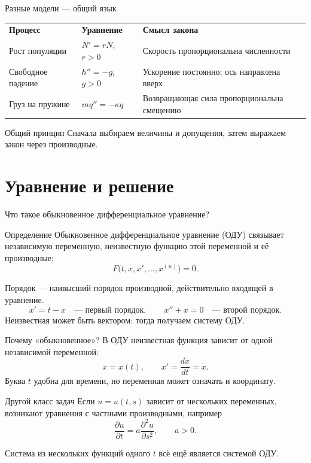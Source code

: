 \documentclass[aspectratio=169,11pt]{beamer}
\begin{document}
\begin{frame}{Разные модели --- общий язык}
  \renewcommand{\arraystretch}{1.6}
  \begin{tabular}{>{\raggedright\arraybackslash}p{}>{\raggedright\arraybackslash}p{}>{\raggedright\arraybackslash}p{}}
    \textbf{Процесс} & \textbf{Уравнение} & \textbf{Смысл закона} \\
    Рост популяции & $N'=rN$, $r>0$ & Скорость пропорциональна численности \\
    Свободное падение & $h''=-g$, $g>0$ & Ускорение постоянно; ось направлена вверх \\
    Груз на пружине & $mq''=-\kappa q$ & Возвращающая сила пропорциональна смещению
  \end{tabular}
  \vspace{.5em}
  \begin{block}{Общий принцип}
    Сначала выбираем величины и допущения, затем выражаем закон через производные.
  \end{block}
\end{frame}

\section{Уравнение и решение}
\begin{frame}{Что такое обыкновенное дифференциальное уравнение?}
  \begin{block}{Определение}
    \alert{Обыкновенное дифференциальное уравнение (ОДУ)} связывает
    независимую переменную, неизвестную функцию этой переменной
    и её производные:
    \[
      F\bigl(t,x,x',\ldots,x^{(n)}\bigr)=0.
    \]
  \end{block}
  \alert{Порядок} --- наивысший порядок производной, действительно входящей в уравнение.
  \[
    x'=t-x\quad\text{--- первый порядок},\qquad
    x''+x=0\quad\text{--- второй порядок}.
  \]
  Неизвестная может быть вектором: тогда получаем систему ОДУ.
\end{frame}

\begin{frame}{Почему «обыкновенное»?}
  В ОДУ неизвестная функция зависит от \alert{одной} независимой переменной:
  \[
    x=x(t),\qquad x' = \frac{dx}{dt}=\dot x.
  \]
  Буква $t$ удобна для времени, но переменная может означать и координату.
  \begin{block}{Другой класс задач}
    Если $u=u(t,s)$ зависит от нескольких переменных, возникают
    уравнения с частными производными, например
    \[
      \frac{\partial u}{\partial t}
      =a\frac{\partial^2u}{\partial s^2},\qquad a>0.
    \]
  \end{block}
  Система из нескольких функций одного $t$ всё ещё является системой ОДУ.
\end{frame}
\end{document}
